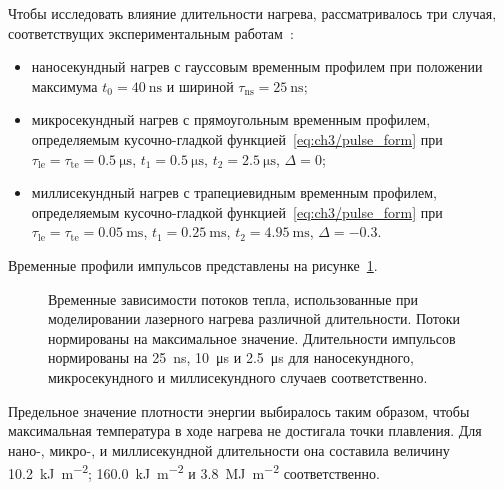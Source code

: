 Чтобы исследовать влияние длительности нагрева, рассматривалось три случая, соответствущих экспериментальным работам~\cite{Zlobinski2019,Zlobinski2020,Gasparyan2021}:
\begin{itemize}
    \item наносекундный нагрев с гауссовым временным профилем при положении максимума \( t_0 = \SI{40}{\nano\second} \) и шириной \(\tau_\mathrm{ns}=\SI{25}{\nano\second} \);
    \item микросекундный нагрев с прямоугольным временным профилем, определяемым кусочно-гладкой функцией~\cref{eq:ch3/pulse_form} при \(\tau_\mathrm{le}=\tau_\mathrm{te}=\SI{0.5}{\micro\second}\), \(t_1=\SI{0.5}{\micro\second}\), \( t_2=\SI{2.5}{\micro\second}\), \( \Delta=\num{0} \);
    \item миллисекундный нагрев с трапециевидным временным профилем, определяемым кусочно-гладкой функцией~\cref{eq:ch3/pulse_form} при \(\tau_\mathrm{le}=\tau_\mathrm{te}=\SI{0.05}{\milli\second}\), \(t_1=\SI{0.25}{\milli\second}\), \( t_2=\SI{4.95}{\milli\second}\), \( \Delta=\num{-0.3} \).
\end{itemize}
Временные профили импульсов представлены на рисунке~\cref{fig:ch4/laser_time_profiles}.
\begin{figure}[ht]
    \caption{Временные зависимости потоков тепла, использованные при моделировании лазерного нагрева различной длительности. Потоки нормированы на максимальное значение.  Длительности импульсов нормированы на \SI{25}{\nano\second}, \SI{10}{\micro\second} и \SI{2.5}{\micro\second} для наносекундного, микросекундного и миллисекундного случаев соответственно. }\label{fig:ch4/laser_time_profiles}
\end{figure}
Предельное значение плотности энергии выбиралось таким образом, чтобы максимальная температура в ходе нагрева не достигала точки плавления. Для нано-, микро-, и миллисекундной длительности она составила величину \SI{10,2}{\kilo\joule\per\meter\squared}; \SI{160.0}{\kilo\joule\per\meter\squared} и \SI{3,8}{\mega\joule\per\meter\squared} соответственно.

